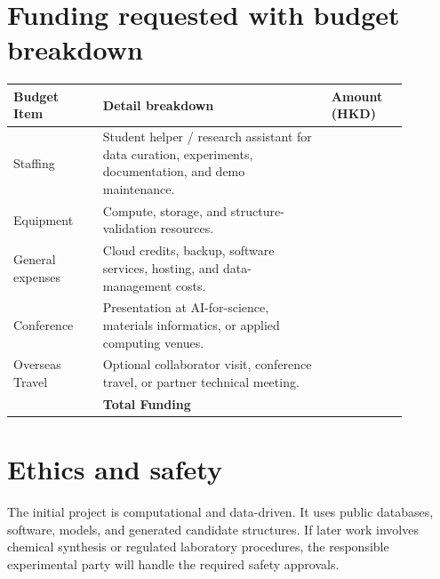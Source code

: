 \documentclass[10pt]{article}
\newcommand{\blank}[1][8em]{\colorbox{yellow!35}{\rule{0pt}{1.1em}\hspace{#1}}}
\begin{document}
\section*{Funding requested with budget breakdown}
\begin{center}
\small
\begin{tabular}{p{0.20\linewidth}p{0.51\linewidth}p{0.17\linewidth}}
\toprule
\textbf{Budget Item} & \textbf{Detail breakdown} & \textbf{Amount (HKD)} \\
\midrule
Staffing & Student helper / research assistant for data curation, experiments, documentation, and demo maintenance. & \blank \\
Equipment & Compute, storage, and structure-validation resources. & \blank \\
General expenses & Cloud credits, backup, software services, hosting, and data-management costs. & \blank \\
Conference & Presentation at AI-for-science, materials informatics, or applied computing venues. & \blank \\
Overseas Travel & Optional collaborator visit, conference travel, or partner technical meeting. & \blank \\
\midrule
 & \textbf{Total Funding} & \blank \\
\bottomrule
\end{tabular}
\end{center}

\section*{Ethics and safety}
The initial project is computational and data-driven. It uses public databases, software, models, and generated candidate structures. If later work involves chemical synthesis or regulated laboratory procedures, the responsible experimental party will handle the required safety approvals.
\end{document}
